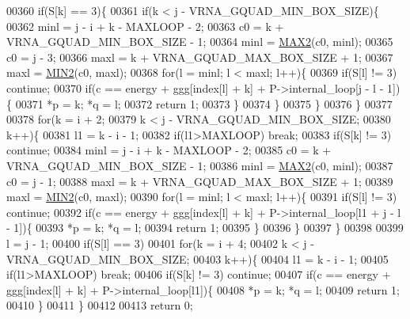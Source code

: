 \begin{DoxyCode}
00360   \textcolor{keywordflow}{if}(S[k] == 3)\{
00361     \textcolor{keywordflow}{if}(k < j - VRNA\_GQUAD\_MIN\_BOX\_SIZE)\{
00362       minl  = j - i + k - MAXLOOP - 2;
00363       c0    = k + VRNA\_GQUAD\_MIN\_BOX\_SIZE - 1;
00364       minl  = \hyperlink{group__utils_gadd91367918fadbc8d585940d6206d6d2}{MAX2}(c0, minl);
00365       c0    = j - 3;
00366       maxl  = k + VRNA\_GQUAD\_MAX\_BOX\_SIZE + 1;
00367       maxl  = \hyperlink{group__utils_ga2dd4a927a7f937f43a90c144d79107d8}{MIN2}(c0, maxl);
00368       \textcolor{keywordflow}{for}(l = minl; l < maxl; l++)\{
00369         \textcolor{keywordflow}{if}(S[l] != 3) \textcolor{keywordflow}{continue};
00370         \textcolor{keywordflow}{if}(c == energy + ggg[index[l] + k] + P->internal\_loop[j - l - 1])\{
00371           *p = k; *q = l;
00372           \textcolor{keywordflow}{return} 1;
00373         \}
00374       \}
00375     \}
00376   \}
00377 
00378   \textcolor{keywordflow}{for}(k = i + 2;
00379       k < j - VRNA\_GQUAD\_MIN\_BOX\_SIZE;
00380       k++)\{
00381     l1    = k - i - 1;
00382     \textcolor{keywordflow}{if}(l1>MAXLOOP) \textcolor{keywordflow}{break};
00383     \textcolor{keywordflow}{if}(S[k] != 3) \textcolor{keywordflow}{continue};
00384     minl  = j - i + k - MAXLOOP - 2;
00385     c0    = k + VRNA\_GQUAD\_MIN\_BOX\_SIZE - 1;
00386     minl  = \hyperlink{group__utils_gadd91367918fadbc8d585940d6206d6d2}{MAX2}(c0, minl);
00387     c0    = j - 1;
00388     maxl  = k + VRNA\_GQUAD\_MAX\_BOX\_SIZE + 1;
00389     maxl  = \hyperlink{group__utils_ga2dd4a927a7f937f43a90c144d79107d8}{MIN2}(c0, maxl);
00390     \textcolor{keywordflow}{for}(l = minl; l < maxl; l++)\{
00391       \textcolor{keywordflow}{if}(S[l] != 3) \textcolor{keywordflow}{continue};
00392       \textcolor{keywordflow}{if}(c == energy + ggg[index[l] + k] + P->internal\_loop[l1 + j - l - 1])\{
00393         *p = k; *q = l;
00394         \textcolor{keywordflow}{return} 1;
00395       \}
00396     \}
00397   \}
00398 
00399   l = j - 1;
00400   \textcolor{keywordflow}{if}(S[l] == 3)
00401     \textcolor{keywordflow}{for}(k = i + 4;
00402         k < j - VRNA\_GQUAD\_MIN\_BOX\_SIZE;
00403         k++)\{
00404       l1    = k - i - 1;
00405       \textcolor{keywordflow}{if}(l1>MAXLOOP) \textcolor{keywordflow}{break};
00406       \textcolor{keywordflow}{if}(S[k] != 3) \textcolor{keywordflow}{continue};
00407       \textcolor{keywordflow}{if}(c == energy + ggg[index[l] + k] + P->internal\_loop[l1])\{
00408         *p = k; *q = l;
00409         \textcolor{keywordflow}{return} 1;
00410       \}
00411     \}
00412 
00413   \textcolor{keywordflow}{return} 0;

\end{DoxyCode}

